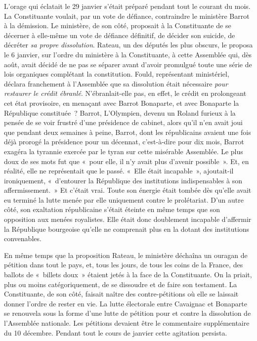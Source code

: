 \documentclass[french,twoside]{book} %
\begin{document}
L’orage qui éclatait le 29 janvier s’était préparé pendant tout le courant du mois. La Constituante voulait, par un vote de défiance, contraindre le ministère Barrot à la démission. Le ministère, de son côté, proposait à la Constituante de se décerner à elle-même un vote de défiance définitif, de décider son suicide, de décréter \emph{sa propre dissolution}. Rateau, un des députés les plus obscurs, le proposa le 6 janvier, sur l’ordre du ministère à la Constituante, à cette Assemblée qui, dès août, avait décidé de ne pas se séparer avant d’avoir promulgué toute une série de lois organiques complétant la constitution. Fould, représentant ministériel, déclara franchement à l’Assemblée que sa dissolution était nécessaire \emph{pour restaurer le crédit ébranlé}. N’ébranlait-elle pas, en effet, le crédit en prolongeant cet état provisoire, en menaçant avec Barrot Bonaparte, et avec Bonaparte la République constituée ? Barrot, L’Olympien, devenu un Roland furieux à la pensée de se voir frustré d’une présidence de cabinet, alors qu’il n’en avait joui que pendant deux semaines à peine, Barrot, dont les républicains avaient une fois déjà prorogé la présidence pour un décennat, c’est-à-dire pour dix mois, Barrot exagéra la tyrannie exercée par le tyran sur cette misérable Assemblée. Le plus doux de ses mots fut que « pour elle, il n’y avait plus d’avenir possible ». Et, en réalité, elle ne représentait que le passé. « Elle était incapable », ajoutait-il ironiquement, « d’entourer la République des institutions indispensables à son affermissement. » Et c’était vrai. Toute son énergie était tombée dès qu’elle avait eu terminé la lutte menée par elle uniquement contre le prolétariat. D’un autre côté, son exaltation républicaine s’était éteinte en même temps que son opposition aux menées royalistes. Elle était donc doublement incapable d’affermir la République bourgeoise qu’elle ne comprenait plus en la dotant des institutions convenables.\par
En même temps que la proposition Rateau, le ministère déchaîna un ouragan de pétition dans tout le pays, et, tous les jours, de tous les coins de la France, des ballots de « billets doux » étaient jetés à la face de la Constituante. On la priait, plus ou moins catégoriquement, de se dissoudre et de faire son testament. La Constituante, de son côté, faisait naître des contre-pétitions où elle se laissait donner l’ordre de rester en vie. La lutte électorale entre Cavaignac et Bonaparte se renouvela sous la forme d’une lutte de pétition pour et contre la dissolution de l’Assemblée nationale. Les pétitions devaient être le commentaire supplémentaire du 10 décembre. Pendant tout le cours de janvier cette agitation persista.\par
\end{document}
